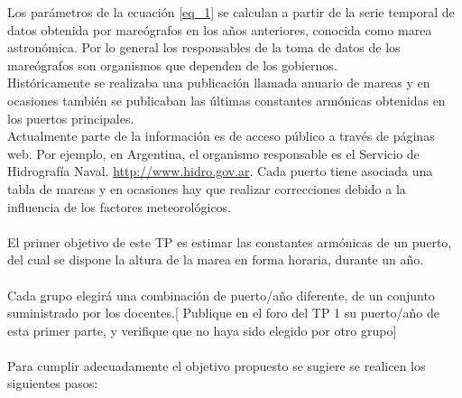 \documentclass[10pt,a4paper]{article}
\numberwithin{equation}{section}
\numberwithin{figure}{section}
\numberwithin{table}{section}
\begin{document}
Los parámetros de la ecuación \ref*{eq_1} se calculan a partir de la serie temporal de datos obtenida por mareógrafos en los años anteriores, conocida como marea astronómica. Por lo general los responsables de la toma de datos de los mareógrafos son organismos que dependen de los gobiernos.\\
Históricamente se realizaba una publicación llamada anuario de mareas y en ocasiones también se publicaban las últimas constantes armónicas obtenidas en los puertos principales.\\
Actualmente parte de la información es de acceso público a través de páginas web. Por ejemplo, en Argentina, el organismo responsable es el Servicio de Hidrografía Naval. \url{http://www.hidro.gov.ar}. Cada puerto tiene asociada una tabla de mareas y en ocasiones hay que realizar correcciones debido a la influencia de los factores meteorológicos.\\
\\
El primer objetivo de este TP es estimar las constantes armónicas de un puerto, del cual se dispone la altura de la marea en forma horaria, durante un año.\\
\\
Cada grupo elegirá una combinación de puerto/año diferente, de un conjunto suministrado por los docentes.[ Publique en el foro del TP 1 su puerto/año de esta primer parte, y verifique que no haya sido elegido por otro grupo]\\
\\
Para cumplir adecuadamente el objetivo propuesto se sugiere se realicen los siguientes pasos:
\end{document}
